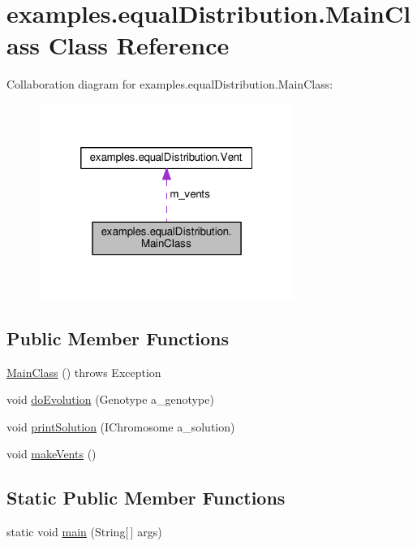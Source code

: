 \hypertarget{classexamples_1_1equal_distribution_1_1_main_class}{\section{examples.\-equal\-Distribution.\-Main\-Class Class Reference}
\label{classexamples_1_1equal_distribution_1_1_main_class}
}


Collaboration diagram for examples.\-equal\-Distribution.\-Main\-Class\-:
\nopagebreak
\begin{figure}[H]
\begin{center}
\leavevmode
\includegraphics[width=236pt]{classexamples_1_1equal_distribution_1_1_main_class__coll__graph}
\end{center}
\end{figure}
\subsection*{Public Member Functions}
\begin{DoxyCompactItemize}
\item 
\hyperlink{classexamples_1_1equal_distribution_1_1_main_class_a216b54e45ae5404b3657c6040a7d8c0f}{Main\-Class} ()  throws Exception 
\item 
void \hyperlink{classexamples_1_1equal_distribution_1_1_main_class_aea64bd22aa5a3f771dd01e4e459f9e50}{do\-Evolution} (Genotype a\-\_\-genotype)
\item 
void \hyperlink{classexamples_1_1equal_distribution_1_1_main_class_a4aff9d8b3366cb173d00966f9f9d3057}{print\-Solution} (I\-Chromosome a\-\_\-solution)
\item 
void \hyperlink{classexamples_1_1equal_distribution_1_1_main_class_ab0da7b13a0ea1bc7393d25b830822a68}{make\-Vents} ()
\end{DoxyCompactItemize}
\subsection*{Static Public Member Functions}
\begin{DoxyCompactItemize}
\item 
static void \hyperlink{classexamples_1_1equal_distribution_1_1_main_class_a6f685f97156486d1560bb9ef6cad9a9c}{main} (String\mbox{[}$\,$\mbox{]} args)
\end{DoxyCompactItemize}
